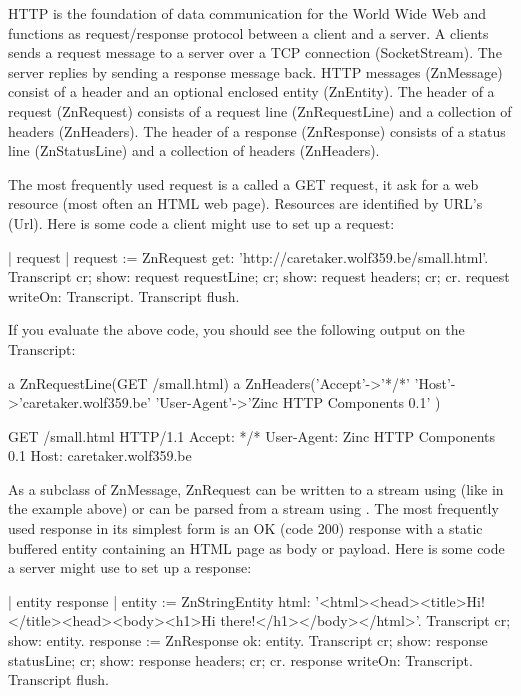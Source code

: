 \documentclass[a4paper,10pt,twoside]{book}
\begin{document}
HTTP is the foundation of data communication for the World Wide Web and functions as request/response protocol between a client and a server. A clients sends a request message to a server over a TCP connection (SocketStream). The server replies by sending a response message back. HTTP messages (ZnMessage) consist of a header and an optional enclosed entity (ZnEntity). The header of a request (ZnRequest) consists of a request line (ZnRequestLine) and a collection of headers (ZnHeaders). The header of a response (ZnResponse) consists of a status line (ZnStatusLine) and a collection of headers (ZnHeaders).

The most frequently used request is a called a GET request, it ask for a web resource (most often an HTML web page). Resources are identified by URL's (Url). Here is some code a client might use to set up a request:

\begin{code}{}
| request |
request := ZnRequest get: 'http://caretaker.wolf359.be/small.html'.
Transcript 
  cr; show: request requestLine;
  cr; show: request headers;
  cr; cr.
request writeOn: Transcript.
Transcript flush.
\end{code}  

If you evaluate the above code, you should see the following output on the Transcript:
\begin{code}{}
a ZnRequestLine(GET /small.html)
a ZnHeaders('Accept'->'*/*' 'Host'->'caretaker.wolf359.be' 'User-Agent'->'Zinc HTTP Components 0.1' )

GET /small.html HTTP/1.1
Accept: */*
User-Agent: Zinc HTTP Components 0.1
Host: caretaker.wolf359.be
\end{code}
As a subclass of ZnMessage, ZnRequest can be written to a stream using  (like in the example above) or can be parsed from a stream using . The most frequently used response in its simplest form is an OK (code 200) response with a static buffered entity containing an HTML page as body or payload. Here is some code a server might use to set up a response:

\begin{code}{}
| entity response |
entity := ZnStringEntity html: '<html><head><title>Hi!</title><head><body><h1>Hi there!</h1></body></html>'.
Transcript
  cr; show: entity.
response := ZnResponse ok: entity.
Transcript 
  cr; show: response statusLine;
  cr; show: response headers;
  cr; cr.
response writeOn: Transcript.
Transcript flush.
\end{code}
\end{document}
